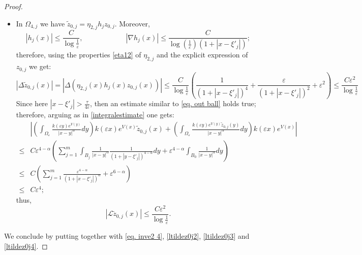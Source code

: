 \documentclass[11pt]{article}
\begin{document}
\begin{proof}
\begin{itemize}
\begin{align*}
\le&C\left(\frac1{\left(1+\left|x-\xi'_j\right|\right)^{6-\alpha}}+\frac{1+\left|\log\left|x-\xi'_j\right|\right|}{\left(1+\left|x-\xi'_j\right|\right)^4}\right)\\
\le&\frac C{\left(1+\left|x-\xi'_j\right|\right)^{4-\alpha}};
\end{align*}
this shows that, again,
\begin{equation}\label{ltildez0j3}
|\mathcal L\widetilde z_{0,j}|\le\frac C{\log\left(\frac1\varepsilon\right)\left(1+\left|x-\xi'_j\right|\right)^{\min\{3,4-\alpha\}}}
\end{equation}
\item In $\Omega_{4,j}$ we have $\widetilde z_{0,j}=\eta_{2,j}h_jz_{0,j}$. Moreover,
$$|h_j(x)|\le\frac C{\log\frac1\varepsilon},\qquad\qquad\qquad|\nabla h_j(x)|\le\frac C{\log\left(\frac1\varepsilon\right)\left(1+\left|x-\xi'_j\right|\right)};$$
therefore, using the properties \eqref{eta12} of $\eta_{2,j}$ and the explicit expression of $z_{0,j}$ we get:
$$|\Delta\widetilde z_{0,j}(x)|=|\Delta(\eta_{2,j}(x)h_j(x)z_{0,j}(x))|\le\frac C{\log\frac1\varepsilon}\left(\frac1{\left(1+\left|x-\xi'_j\right|\right)^4}+\frac\varepsilon{\left(1+\left|x-\xi'_j\right|\right)^2}+\varepsilon^2\right)\le\frac{C\varepsilon^2}{\log\frac1\varepsilon}$$
Since here $\left|x-\xi'_j\right|>\frac\tau{4\varepsilon}$, then an estimate similar to \eqref{eq. out ball} holds true; therefore, arguing as in \eqref{integralestimate} one gets:
\begin{align*}
&\left|\left(\int_{\Omega_\varepsilon}\frac{k(\varepsilon y)e^{V(y)}}{|x-y|^\alpha}dy\right)k(\varepsilon x)e^{V(x)}\widetilde z_{0,j}(x)+\left(\int_{\Omega_\varepsilon}\frac{k(\varepsilon y)e^{V(y)}\widetilde z_{0,j}(y)}{|x-y|^\alpha}dy\right)k(\varepsilon x)e^{V(x)}\right|\\
\le&C\varepsilon^{4-\alpha}\left(\sum_{j=1}^m\int_{B_j}\frac1{|x-y|^\alpha}\frac1{\left(1+\left|y-\xi'_j\right|\right)^{4-\alpha}}dy+\varepsilon^{4-\alpha}\int_{B_0}\frac1{|x-y|^\alpha}dy\right)\\
\le&C\left(\sum_{j=1}^m\frac{\varepsilon^{4-\alpha}}{\left(1+\left|x-\xi'_j\right|\right)^\alpha}+\varepsilon^{6-\alpha}\right)\\
\le&C\varepsilon^4;
\end{align*}
thus,
\begin{equation}\label{ltildez0j4}
|\mathcal L\widetilde z_{0,j}(x)|\le\frac{C\varepsilon^2}{\log\frac1\varepsilon}.
\end{equation}
\end{itemize}
We conclude by putting together with \eqref{eq. inve2 4}, \eqref{ltildez0j2}, \eqref{ltildez0j3} and \eqref{ltildez0j4}.
\end{proof}
\end{document}
